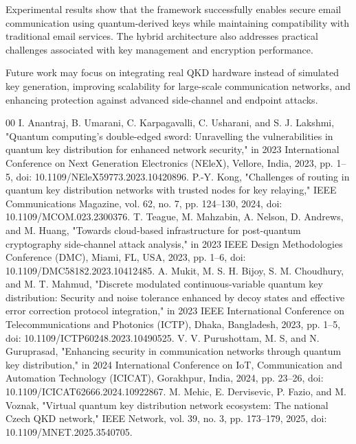 \documentclass[conference]{IEEEtran}
\begin{document}
Experimental results show that the framework successfully enables secure email communication using quantum-derived keys while maintaining compatibility with traditional email services. The hybrid architecture also addresses practical challenges associated with key management and encryption performance.

Future work may focus on integrating real QKD hardware instead of simulated key generation, improving scalability for large-scale communication networks, and enhancing protection against advanced side-channel and endpoint attacks.


\begin{thebibliography}{00}
 I. Anantraj, B. Umarani, C. Karpagavalli, C. Usharani, and S. J. Lakshmi, "Quantum computing's double-edged sword: Unravelling the vulnerabilities in quantum key distribution for enhanced network security," in 2023 International Conference on Next Generation Electronics (NEleX), Vellore, India, 2023, pp. 1–5, doi: 10.1109/NEleX59773.2023.10420896.
 P.-Y. Kong, "Challenges of routing in quantum key distribution networks with trusted nodes for key relaying," IEEE Communications Magazine, vol. 62, no. 7, pp. 124–130, 2024, doi: 10.1109/MCOM.023.2300376.
 T. Teague, M. Mahzabin, A. Nelson, D. Andrews, and M. Huang, "Towards cloud-based infrastructure for post-quantum cryptography side-channel attack analysis," in 2023 IEEE Design Methodologies Conference (DMC), Miami, FL, USA, 2023, pp. 1–6, doi: 10.1109/DMC58182.2023.10412485.
 A. Mukit, M. S. H. Bijoy, S. M. Choudhury, and M. T. Mahmud, "Discrete modulated continuous-variable quantum key distribution: Security and noise tolerance enhanced by decoy states and effective error correction protocol integration," in 2023 IEEE International Conference on Telecommunications and Photonics (ICTP), Dhaka, Bangladesh, 2023, pp. 1–5, doi: 10.1109/ICTP60248.2023.10490525.
 V. V. Purushottam, M. S, and N. Guruprasad, "Enhancing security in communication networks through quantum key distribution," in 2024 International Conference on IoT, Communication and Automation Technology (ICICAT), Gorakhpur, India, 2024, pp. 23–26, doi: 10.1109/ICICAT62666.2024.10922867.
 M. Mehic, E. Dervisevic, P. Fazio, and M. Voznak, "Virtual quantum key distribution network ecosystem: The national Czech QKD network," IEEE Network, vol. 39, no. 3, pp. 173–179, 2025, doi: 10.1109/MNET.2025.3540705.

\end{thebibliography}
\end{document}
